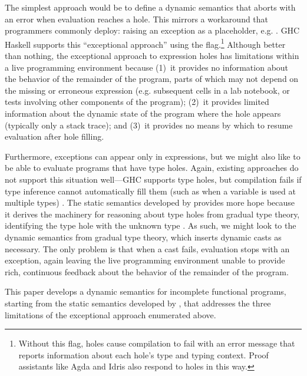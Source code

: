 The simplest approach would be to define a dynamic semantics that aborts with an error when evaluation reaches a hole. 
%
This mirrors a workaround that programmers commonly deploy: 
raising an exception as a placeholder, e.g. . 
GHC Haskell supports this ``exceptional approach'' using the  flag.\footnote{
Without this flag, holes cause compilation to fail with an error message that reports information about each hole's type and typing context. 
Proof assistants like Agda \cite{norell:thesis,norell2009dependently} and Idris \cite{brady2013idris} also respond to holes in this way.
} 
Although better than nothing, the exceptional approach to expression holes has limitations 
within a live programming environment because 
(1)~it provides no information about the behavior of the remainder of the program, 
parts of which may not depend on the missing or erroneous expression (e.g. subsequent cells in a lab notebook, or tests involving other components of the program);  
(2)~it provides limited information about the dynamic state of the program where the hole appears 
(typically only a stack trace);  and
(3)~it provides no means by which to resume evaluation after hole filling.

Furthermore, exceptions can appear only in expressions, but we might also like to be able to evaluate programs that have type holes. Again, existing approaches do not support this situation well---GHC supports type holes, but compilation fails if type inference cannot automatically fill them (such as when a variable is used at multiple types) \cite{GHCHoles}. 
The static semantics developed by \citet{popl-paper} provides more hope because it derives the machinery for 
reasoning about type holes from gradual type theory, 
identifying the type hole with the unknown type \cite{DBLP:conf/snapl/SiekVCB15,Siek06a}.
%
As such, we might look to the dynamic semantics from
gradual type theory, 
which inserts dynamic casts as necessary. 
The only problem is that when a cast fails, evaluation stops with 
an exception, again leaving the live programming environment unable to provide rich, continuous feedback about the behavior of the remainder of the program.


This paper develops a dynamic semantics for incomplete functional programs, starting from the static semantics developed by \citet{popl-paper},  that addresses the three limitations of the exceptional approach enumerated above.

